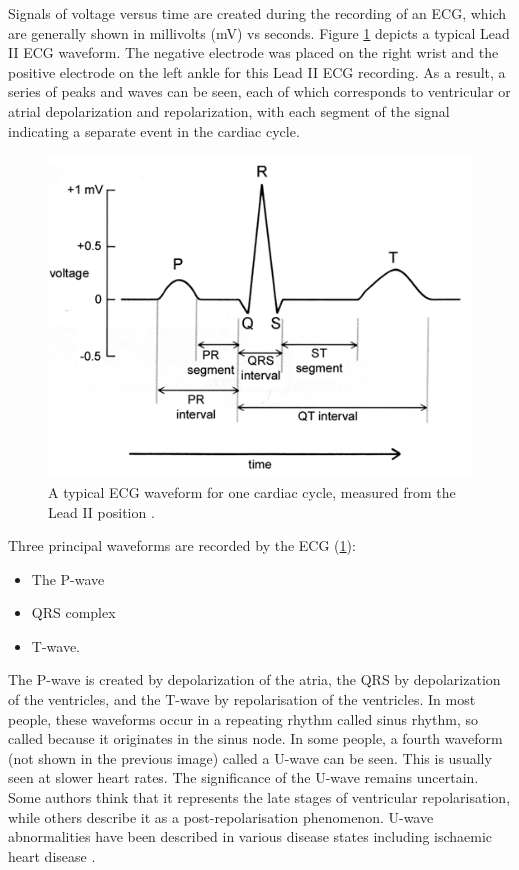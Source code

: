 Signals of voltage versus time are created during the recording of an ECG, which are generally shown in millivolts (mV) vs seconds. Figure \ref{fig:ECG_waveform} depicts a typical Lead II ECG waveform. The negative electrode was placed on the right wrist and the positive electrode on the left ankle for this Lead II ECG recording. As a result, a series of peaks and waves can be seen, each of which corresponds to ventricular or atrial depolarization and repolarization, with each segment of the signal indicating a separate event in the cardiac cycle.

\begin{figure}[H]
\centering
\includegraphics[scale=0.7]{img/ECG_waveform.PNG}
\caption{A typical ECG waveform for one cardiac cycle, measured from the Lead II position \cite{ecg1}.}
\label{fig:ECG_waveform}
\end{figure}
 
Three principal waveforms are recorded by the ECG (\ref{fig:ECG_waveform}):

\begin{itemize}
    \item The P-wave
    \item QRS complex
    \item T-wave.
\end{itemize}

The P-wave is created by depolarization of the atria, the QRS by depolarization of the ventricles, and the T-wave by repolarisation of the ventricles. In most people, these waveforms occur in a repeating rhythm called sinus rhythm, so called because it originates in the sinus node. In some people, a fourth waveform (not shown in the previous image) called a U-wave can be seen. This is usually seen at slower heart rates. The significance of the U-wave remains uncertain. Some authors think that it represents the late stages of ventricular repolarisation, while others describe it as a post-repolarisation phenomenon. U-wave abnormalities have been described in various disease states including ischaemic heart disease \cite{ecg2}.
 
